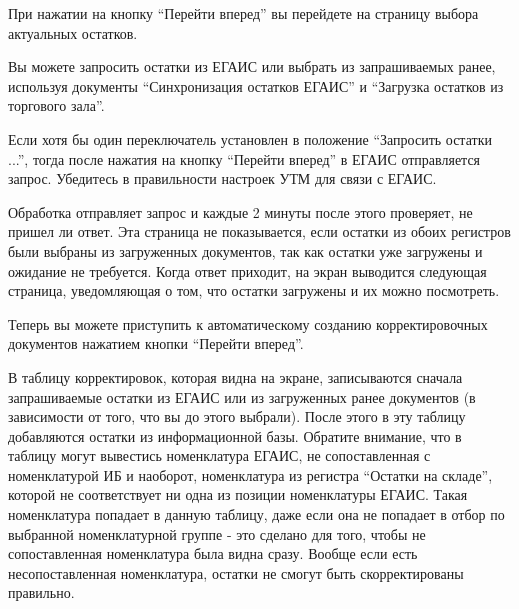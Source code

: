 \documentclass[letterpaper,10pt,russian]{sphinxmanual}
\begin{document}
При нажатии на кнопку ``Перейти вперед'' вы перейдете на страницу выбора актуальных остатков.
\begin{figure}[htbp]
\centering

\noindent{}
\end{figure}

Вы можете запросить остатки из ЕГАИС или выбрать из запрашиваемых ранее, используя документы ``Синхронизация остатков ЕГАИС'' и ``Загрузка остатков из торгового зала''.

Если хотя бы один переключатель установлен в положение ``Запросить остатки ...'', тогда после нажатия на кнопку ``Перейти вперед'' в ЕГАИС отправляется запрос. Убедитесь в правильности настроек УТМ для связи с ЕГАИС.
\begin{figure}[htbp]
\centering

\noindent{}
\end{figure}

Обработка отправляет запрос и каждые 2 минуты после этого проверяет, не пришел ли ответ. Эта страница не показывается, если остатки из обоих регистров были выбраны из загруженных документов, так как остатки уже загружены и ожидание не требуется. Когда ответ приходит, на экран выводится следующая страница, уведомляющая о том, что остатки загружены и их можно посмотреть.
\begin{figure}[htbp]
\centering

\noindent{}
\end{figure}

Теперь вы можете приступить к автоматическому созданию корректировочных документов нажатием кнопки ``Перейти вперед''.
\begin{figure}[htbp]
\centering

\noindent{}
\end{figure}

В таблицу корректировок, которая видна на экране, записываются сначала запрашиваемые остатки из ЕГАИС или из загруженных ранее документов (в зависимости от того, что вы до этого выбрали). После этого в эту таблицу добавляются остатки из информационной базы. Обратите внимание, что в таблицу могут вывестись номенклатура ЕГАИС, не сопоставленная с номенклатурой ИБ и наоборот, номенклатура из регистра ``Остатки на складе'', которой не соответствует ни одна из позиции номенклатуры ЕГАИС. Такая номенклатура попадает в данную таблицу, даже если она не попадает в отбор по выбранной номенклатурной группе - это сделано для того, чтобы не сопоставленная номенклатура была видна сразу. Вообще если есть несопоставленная номенклатура, остатки не смогут быть скорректированы правильно.
\end{document}
